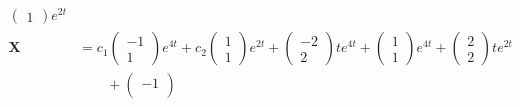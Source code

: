 \documentclass{article}
\begin{document}
\begin{align*}
\begin{pmatrix}
                                                                                                    1
                                                                                                  \end{pmatrix} e^{2 t}                                 \\
  \mathbf{X}      & = c_1 \begin{pmatrix}
                            -1 \\
                            1
                          \end{pmatrix} e^{4 t} + c_2 \begin{pmatrix}
                                                        1 \\
                                                        1
                                                      \end{pmatrix} e^{2 t} + \begin{pmatrix}
                                                                                -2 \\
                                                                                2
                                                                              \end{pmatrix} t e^{4 t} + \begin{pmatrix}
                                                                                                          1 \\
                                                                                                          1
                                                                                                        \end{pmatrix} e^{4 t} + \begin{pmatrix}
                                                                                                                                  2 \\
                                                                                                                                  2
                                                                                                                                \end{pmatrix} t e^{2 t} \\
                  & \qquad + \begin{pmatrix}
                               -1 \\

\end{pmatrix}
\end{align*}
\end{document}
